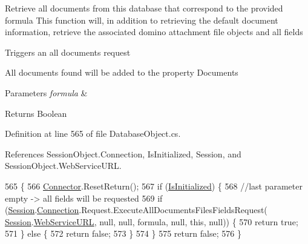 Retrieve all documents from this database that correspond to the provided formula This function will, in addition to retrieving the default document information, retrieve the associated domino attachment file objects and all fields 

Triggers an all documents request

All documents found will be added to the property \textquotesingle{}Documents\textquotesingle{}


\begin{DoxyParams}{Parameters}
{\em formula} & \\
\hline
\end{DoxyParams}
\begin{DoxyReturn}{Returns}
Boolean
\end{DoxyReturn}


Definition at line 565 of file Database\+Object.\+cs.



References Session\+Object.\+Connection, Is\+Initialized, Session, and Session\+Object.\+Web\+Service\+U\+RL.


\begin{DoxyCode}
565                                                                           \{
566         \mbox{\hyperlink{class_connector}{Connector}}.ResetReturn();
567         \textcolor{keywordflow}{if} (\mbox{\hyperlink{class_database_object_a5fe036d32a30eb10d1b3f6a30263f740}{IsInitialized}}) \{
568             \textcolor{comment}{//last parameter empty -> all fields will be requested}
569             \textcolor{keywordflow}{if} (\mbox{\hyperlink{class_database_object_aa8484162b7d2a7c4c9426bca13c64c07}{Session}}.\mbox{\hyperlink{class_session_object_a014bdbf705a753540e19bfb53030c55c}{Connection}}.Request.ExecuteAllDocumentsFilesFieldsRequest(
      \mbox{\hyperlink{class_database_object_aa8484162b7d2a7c4c9426bca13c64c07}{Session}}.\mbox{\hyperlink{class_session_object_a697c071c812fbf7ad1166b896fb44c16}{WebServiceURL}}, null, null, formula, null, \textcolor{keyword}{this}, null)) \{ 
570                 \textcolor{keywordflow}{return} \textcolor{keyword}{true};
571             \} \textcolor{keywordflow}{else} \{
572                 \textcolor{keywordflow}{return} \textcolor{keyword}{false};
573             \}
574         \}
575         \textcolor{keywordflow}{return} \textcolor{keyword}{false};
576     \}
\end{DoxyCode}
\mbox{\label{class_database_object_a5f69325c3b09142f2a3a9ae509ef02fa}} 
